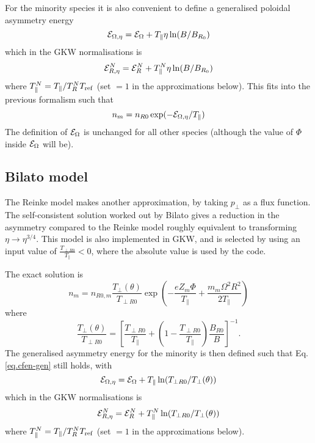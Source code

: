 For the minority species it is also convenient to define a generalised poloidal asymmetry energy
\begin{equation}
  {\cal E}_{\Omega,\eta} = {\cal E}_{\Omega} + T_\parallel \eta \ln({B/B_{R_0}})
  \label{eq.poloidal-energy}
\end{equation}
which in the GKW normalisations is 
\begin{equation}
  {\cal E}^N_{R,\eta} = {\cal E}^N_R + T^N_\parallel \eta \ln({B/B_{R_0}})
\end{equation}
where $T^N_\parallel = T_\parallel / T^N_R T_{\rm ref}$  (set $ = 1 $ in the approximations below).  This 
fits into the previous formalism such that 
\begin{equation}
  n_m = n_{R0} \exp(-{\cal E}_{\Omega,\eta}/T_\parallel)
\label{eq.cfen-gen}
\end{equation}
The definition of $\mathcal{E}_\Omega$ is unchanged for all other species (although the value of $\Phi$ inside $\mathcal{E}_\Omega$ will be).

\subsection{Bilato model \label{sec.icrh2}}
The Reinke model makes another approximation, by taking $p_\perp$ as a flux function.  The self-consistent solution worked out by Bilato \cite{Bilato14} gives a reduction in the asymmetry compared to the Reinke model roughly equivalent to transforming $\eta \rightarrow \eta^{3/4}$.  This model is also implemented in GKW, and is selected by using an input value of $\frac{T_{\perp R0}}{T_{\parallel}} < 0$, where the absolute value is used by the code.

The exact solution is 
\begin{equation}
 n_m = n_{R0,m} \frac{T_{\perp}(\theta)}{T_{\perp R0}}  \exp\left(-\frac{e Z_m \Phi}{T_\parallel} + \frac{m_m \Omega^2 R^2}{2 T_\parallel}\right)
\end{equation}
where
\begin{equation}
 \frac{T_{\perp}(\theta)}{T_{\perp R0}} = \left [ \frac{T_{\perp
 R0}}{T_{\parallel}} + \left(1 - \frac{T_{\perp R0}}{T_{\parallel}} \right )\frac{B_{R0}}{B} \right ]^{-1}.
\end{equation}
The generalised asymmetry energy for the minority is then defined such that Eq. \ref{eq.cfen-gen} still holds, with
\begin{equation}
    {\cal E}_{\Omega,\eta} = {\cal E}_{\Omega} + T_\parallel \ln({T_{\perp R0}}/{T_{\perp}(\theta)})
\label{eq.poloidal-energy2}
\end{equation}
which in the GKW normalisations is 
\begin{equation}
   {\cal E}^N_{R,\eta} = {\cal E}^N_R + T^N_\parallel \ln({T_{\perp R0}}/{T_{\perp}(\theta)})
\end{equation}
where $T^N_\parallel = T_\parallel / T^N_R T_{\rm ref}$  (set $ = 1 $ in the approximations below).

